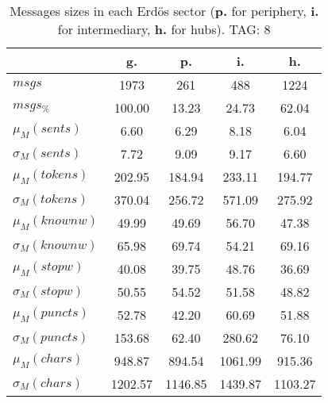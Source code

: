 \begin{table}[h!]
\begin{center}
\begin{tabular}{| l | c | c | c | c |}\hline
 & g. & p. & i. & h. \\\hline
$msgs$ & 1973  & 261  & 488  & 1224 \\\hline
$msgs_{\%}$ & 100.00  & 13.23  & 24.73  & 62.04 \\\hline
$\mu_M(sents)$ & 6.60  & 6.29  & 8.18  & 6.04 \\\hline
$\sigma_M(sents)$ & 7.72  & 9.09  & 9.17  & 6.60 \\\hline
$\mu_M(tokens)$ & 202.95  & 184.94  & 233.11  & 194.77 \\\hline
$\sigma_M(tokens)$ & 370.04  & 256.72  & 571.09  & 275.92 \\\hline
$\mu_M(knownw)$ & 49.99  & 49.69  & 56.70  & 47.38 \\\hline
$\sigma_M(knownw)$ & 65.98  & 69.74  & 54.21  & 69.16 \\\hline
$\mu_M(stopw)$ & 40.08  & 39.75  & 48.76  & 36.69 \\\hline
$\sigma_M(stopw)$ & 50.55  & 54.52  & 51.58  & 48.82 \\\hline
$\mu_M(puncts)$ & 52.78  & 42.20  & 60.69  & 51.88 \\\hline
$\sigma_M(puncts)$ & 153.68  & 62.40  & 280.62  & 76.10 \\\hline
$\mu_M(chars)$ & 948.87  & 894.54  & 1061.99  & 915.36 \\\hline
$\sigma_M(chars)$ & 1202.57  & 1146.85  & 1439.87  & 1103.27 \\\hline
\end{tabular}
\caption{Messages sizes in each Erd\"os sector ({{\bf p.}} for periphery, {{\bf i.}} for intermediary, {{\bf h.}} for hubs). TAG: 8}
\end{center}
\end{table}